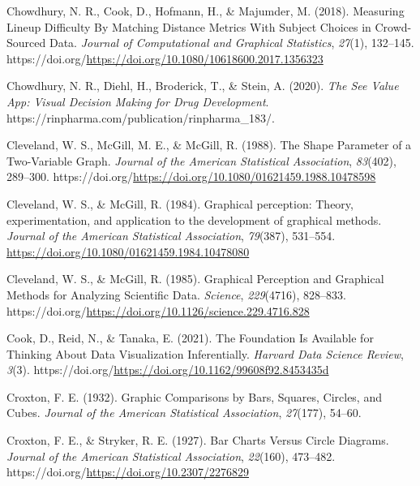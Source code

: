\documentclass[
  10pt,
  letterpaper,
  DIV=11,
  numbers=noendperiod]{scrartcl}
\newlength{\cslhangindent}
\newenvironment{CSLReferences}[2] %
 {\begin{list}{}{%
  \setlength{\itemindent}{0pt}
  \setlength{\leftmargin}{0pt}
  \setlength{\parsep}{0pt}
  \ifodd #1
   \setlength{\leftmargin}{\cslhangindent}
   \setlength{\itemindent}{-1\cslhangindent}
  \fi
  \setlength{\itemsep}{#2\baselineskip}}}
 {\end{list}}
\begin{document}
\begin{CSLReferences}{1}{0}
Chowdhury, N. R., Cook, D., Hofmann, H., \& Majumder, M. (2018).
Measuring Lineup Difficulty By Matching Distance Metrics With Subject
Choices in Crowd-Sourced Data. \emph{Journal of Computational and
Graphical Statistics}, \emph{27}(1), 132--145.
https://doi.org/\url{https://doi.org/10.1080/10618600.2017.1356323}

Chowdhury, N. R., Diehl, H., Broderick, T., \& Stein, A. (2020).
\emph{The {See} {Value} {App}: {Visual} {Decision} {Making} for {Drug}
{Development}}. https://rinpharma.com/publication/rinpharma\_183/.

Cleveland, W. S., McGill, M. E., \& McGill, R. (1988). The {Shape}
{Parameter} of a {Two}-{Variable} {Graph}. \emph{Journal of the American
Statistical Association}, \emph{83}(402), 289--300.
https://doi.org/\url{https://doi.org/10.1080/01621459.1988.10478598}

Cleveland, W. S., \& McGill, R. (1984). Graphical perception: {Theory},
experimentation, and application to the development of graphical
methods. \emph{Journal of the American Statistical Association},
\emph{79}(387), 531--554.
\url{https://doi.org/10.1080/01621459.1984.10478080}

Cleveland, W. S., \& McGill, R. (1985). Graphical {Perception} and
{Graphical} {Methods} for {Analyzing} {Scientific} {Data}.
\emph{Science}, \emph{229}(4716), 828--833.
https://doi.org/\url{https://doi.org/10.1126/science.229.4716.828}

Cook, D., Reid, N., \& Tanaka, E. (2021). The {Foundation} {Is}
{Available} for {Thinking} {About} {Data} {Visualization}
{Inferentially}. \emph{Harvard Data Science Review}, \emph{3}(3).
https://doi.org/\url{https://doi.org/10.1162/99608f92.8453435d}

Croxton, F. E. (1932). Graphic {Comparisons} by {Bars}, {Squares},
{Circles}, and {Cubes}. \emph{Journal of the American Statistical
Association}, \emph{27}(177), 54--60.

Croxton, F. E., \& Stryker, R. E. (1927). Bar {Charts} {Versus} {Circle}
{Diagrams}. \emph{Journal of the American Statistical Association},
\emph{22}(160), 473--482.
https://doi.org/\url{https://doi.org/10.2307/2276829}


\end{CSLReferences}
\end{document}
